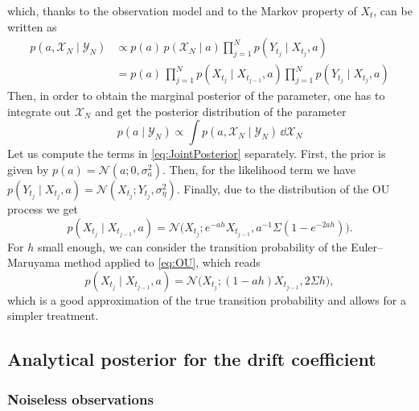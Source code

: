 \documentclass[10pt]{article}
\begin{document}
which, thanks to the observation model and to the Markov property of $X_t$, can be written as
\begin{equation}\label{eq:JointPosterior}
\begin{aligned}
	p(a, \mathcal X_N \mid \mathcal Y_N) &\propto p(a) \, p(\mathcal X_N \mid a) \prod_{j=1}^{N} p(Y_{t_j} \mid X_{t_j}, a)\\
	&= p(a) \, \prod_{j=1}^{N} p(X_{t_j} \mid X_{t_{j-1}}, a) \prod_{j=1}^{N} p(Y_{t_j} \mid X_{t_j}, a)
\end{aligned}
\end{equation}
Then, in order to obtain the marginal posterior of the parameter, one has to integrate out $\mathcal X_N$ and get the posterior distribution of the parameter
\begin{equation}\label{eq:MarginalPosterior}
	p(a \mid \mathcal Y_N) \propto \int p(a, \mathcal X_N \mid \mathcal Y_N) \, \dd \mathcal X_N
\end{equation}
Let us compute the terms in \eqref{eq:JointPosterior} separately. First, the prior is given by $p(a) = \mathcal N(a; 0, \sigma^2_a)$. Then, for the likelihood term we have $p(Y_{t_j} \mid X_{t_j}, a) = \mathcal N(X_{t_j}; Y_{t_j}, \sigma_\eta^2)$. Finally, due to the distribution of the OU process we get
\begin{equation}
	p(X_{t_j} \mid X_{t_{j-1}}, a) = \mathcal N\big(X_{t_j}; e^{-ah}X_{t_{j-1}}, a^{-1}\Sigma(1 - e^{-2ah})\big).
\end{equation}
For $h$ small enough, we can consider the transition probability of the Euler--Maruyama method applied to \eqref{eq:OU}, which reads
\begin{equation}
	p(X_{t_j} \mid X_{t_{j-1}}, a) = \mathcal N\big(X_{t_j}; (1-ah)X_{t_{j-1}}, 2\Sigma h\big),
\end{equation}
which is a good approximation of the true transition probability and allows for a simpler treatment. 

\subsection*{Analytical posterior for the drift coefficient}

\subsubsection*{Noiseless observations}
\end{document}
